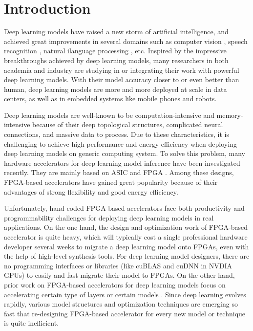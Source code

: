 \documentclass{acm_proc_article-sp-copy}
\begin{document}
\section{Introduction}
Deep learning models have raised a new storm of artificial intelligence, and achieved great improvements in several domains such as computer vision \cite{vgg} \cite{drn} \cite{cvpr'15}, speech recognition \cite{icassp'13}, natural ilanguage processing \cite{app'14}, etc. Inspired by the impressive breakthroughs achieved by deep learning models, many researchers in both academia and industry are studying in or integrating their work with powerful deep learning models. With their model accuracy closer to or even better than human, deep learning models are more and more deployed at scale in data centers, as well as in embedded systems like mobile phones and robots.

Deep learning models are well-known to be computation-intensive and memory-intensive because of their deep topological structures, complicated neural connections, and massive data to process. Due to these characteristics, it is challenging to achieve high performance and energy efficiency when deploying deep learning models on generic computing system. To solve this problem, many hardware accelerators for deep learning model inference have been investigated recently. They are mainly based on ASIC \cite{dadiannao} \cite{pudiannao} and FPGA \cite{fpga'15} \cite{aeye} \cite{fpga'16}. Among these designs, FPGA-based accelerators have gained great popularity because of their advantages of strong flexibility and good energy efficiency.

Unfortunately, hand-coded FPGA-based accelerators face both productivity and programmability challenges for deploying deep learning models in real applications. On the one hand, the design and optimization work of FPGA-based accelerator is quite heavy, which will typically cost a single professional hardware developer several weeks to migrate a deep learning model onto FPGAs, even with the help of high-level synthesis tools. For deep learning model designers, there are no programming interfaces or libraries (like cuBLAS and cuDNN in NVDIA GPUs)  to easily and fast migrate their model to FPGAs. On the other hand, prior work on FPGA-based accelerators for deep learning models focus on accelerating certain type of layers \cite{fpga'15} or certain models \cite{fpga'16} \cite{aeye}. Since deep learning evolves rapidly, various model structures and optimization techniques are emerging so fast that re-designing FPGA-based accelerator for every new model or technique is quite inefficient.
\end{document}
